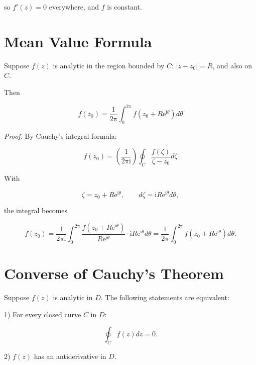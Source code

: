 \documentclass[11pt,a4paper]{article}
\theoremstyle{definition}
\theoremstyle{plain}
\begin{document}
so $f'(z) = 0$ everywhere, and $f$ is constant.

\section{Mean Value Formula}

Suppose $f(z)$ is analytic in the region bounded by $C$: $\vert{}z - z_{0}\vert{} = R$, and also on $C$.

Then

\begin{equation}
f(z_{0}) = \frac{1}{2\mathrm{\pi}}\int_{0}^{2\mathrm{\pi}}f(z_{0} + R\mathrm{e}^{\mathrm{i}\theta})d\theta
\end{equation}

\textit{Proof.} By Cauchy’s integral formula:

\begin{equation}
f(z_{0}) = \left(\frac{1}{2\mathrm{\pi}\mathrm{i}}\right)\oint_{C}\frac{f(\zeta)}{\zeta - z_{0}}d\zeta
\end{equation}

With

\begin{equation}
\zeta = z_{0} + R\mathrm{e}^{\mathrm{i}\theta}, \qquad
d\zeta = \mathrm{i}R\mathrm{e}^{\mathrm{i}\theta} d\theta ,
\end{equation}

the integral becomes

\begin{equation}
f(z_{0}) = \frac{1}{2\mathrm{\pi}\mathrm{i}} \int_{0}^{2\mathrm{\pi}}
\frac{f(z_{0} + R\mathrm{e}^{\mathrm{i}\theta})}{R\mathrm{e}^{\mathrm{i}\theta}}
\cdot \mathrm{i}R\mathrm{e}^{\mathrm{i}\theta} d\theta
= \frac{1}{2\mathrm{\pi}} \int_{0}^{2\mathrm{\pi}} f(z_{0} + R\mathrm{e}^{\mathrm{i}\theta}) d\theta .
\end{equation}

\section{Converse of Cauchy's Theorem}

Suppose $f(z)$ is analytic in $D$. The following statements are equivalent:

1) For every closed curve $C$ in $D$:

\begin{equation}
\oint_{C}f(z)dz = 0.
\end{equation}

2) $f(z)$ has an antiderivative in $D$.
\end{document}
